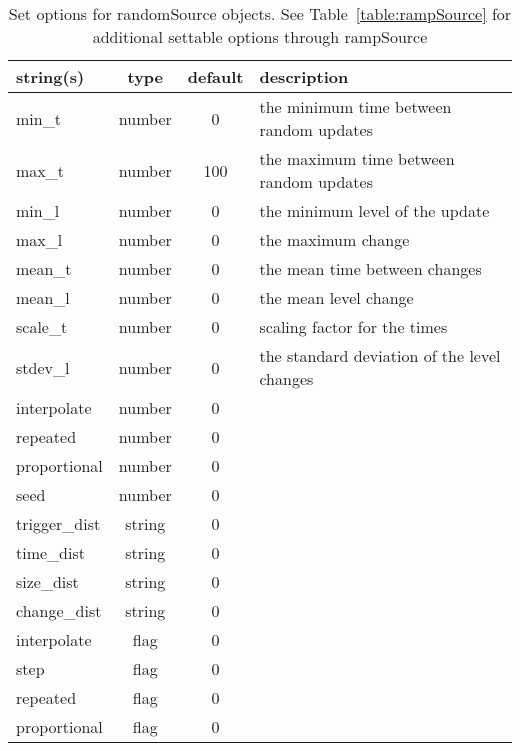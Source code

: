 \begin{table}[ht]
\centering
\begin{tabular}{p{5cm} c c p{7cm}}
\hline
string(s) & type & default & description \\
\hline
min\_t & number & 0 & the minimum time between random updates\\
max\_t & number & 100 & the maximum time between random updates\\
min\_l & number & 0 & the minimum level of the update\\
max\_l & number & 0 & the maximum change\\
mean\_t & number & 0 & the mean time between changes\\
mean\_l & number & 0 & the mean level change\\
scale\_t & number & 0 & scaling factor for the times\\
stdev\_l & number & 0 & the standard deviation of the level changes\\
interpolate & number & 0 & \\
repeated & number & 0 & \\
proportional & number & 0 & \\
seed & number & 0 & \\
trigger\_dist & string & 0 & \\
time\_dist & string & 0 & \\
size\_dist & string & 0 & \\
change\_dist & string & 0 & \\
interpolate & flag & 0 & \\
step & flag & 0 & \\
repeated & flag & 0 & \\
proportional & flag & 0 & \\
\hline
\end{tabular}
\caption{Set options for randomSource objects. See Table~\ref{table:rampSource} for additional settable options through rampSource}
\label{table:randomSource}
\end{table}
